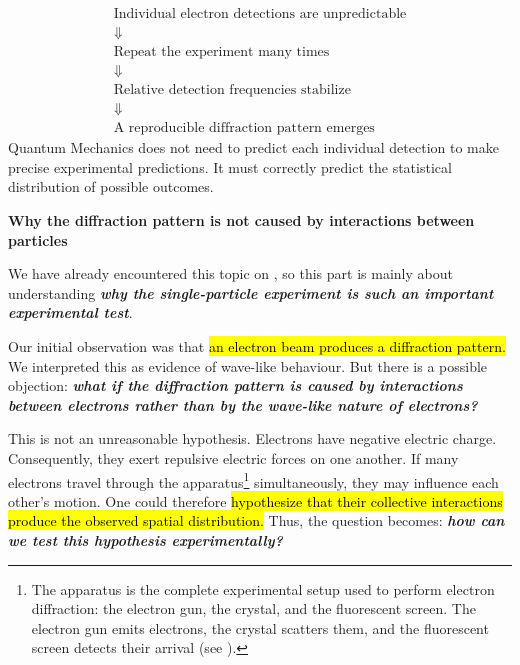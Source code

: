 \highspace
\begin{takeawaysbox}
    \begin{equation*}
        \begin{gathered}
            \text{Individual electron detections are unpredictable}\\
            \Downarrow\\
            \text{Repeat the experiment many times}\\
            \Downarrow\\
            \text{Relative detection frequencies stabilize}\\
            \Downarrow\\
            \text{A reproducible diffraction pattern emerges}
        \end{gathered}
    \end{equation*}
    Quantum Mechanics does not need to predict each individual detection to make precise experimental predictions. It must correctly predict the statistical distribution of possible outcomes.
\end{takeawaysbox}

\newpage

\begin{flushleft}
    \textcolor{Green3}{ \textbf{Why the diffraction pattern is not caused by interactions between particles}}
\end{flushleft}
We have already encountered this topic on , so this part is mainly about understanding \textbf{\emph{why the single-particle experiment is such an important experimental test}}.

\highspace
Our initial observation was that \hl{an electron beam produces a diffraction pattern.} We interpreted this as evidence of wave-like behaviour. But there is a possible objection: \emph{\textbf{what if the diffraction pattern is caused by interactions between electrons rather than by the wave-like nature of electrons?}}

\highspace
This is not an unreasonable hypothesis. Electrons have negative electric charge. Consequently, they exert repulsive electric forces on one another. If many electrons travel through the apparatus\footnote{%
    The apparatus is the complete experimental setup used to perform electron diffraction: the electron gun, the crystal, and the fluorescent screen. The electron gun emits electrons, the crystal scatters them, and the fluorescent screen detects their arrival (see ).%
} simultaneously, they may influence each other's motion. One could therefore \hl{hypothesize that their collective interactions produce the observed spatial distribution.} Thus, the question becomes: \emph{\textbf{how can we test this hypothesis experimentally?}}

